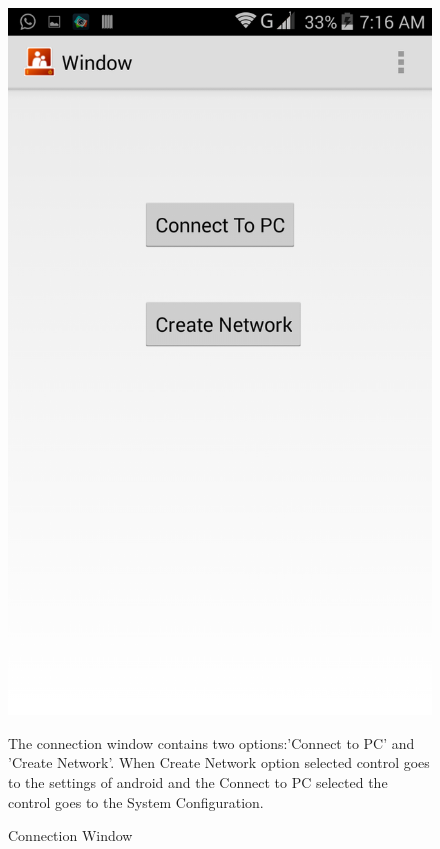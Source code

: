 \begin{figure}
\begin{center}
\scalebox{0.25}
{\includegraphics{window.png}}
\caption{Connection Window}  
\end{center}
The connection window contains two options:'Connect to PC' and 'Create Network'. When Create Network option selected control goes to the settings of android and the Connect to PC selected the control goes to the System Configuration. 
\end{figure}

